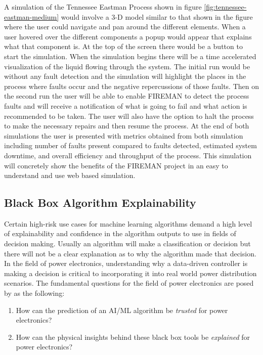 A simulation of the Tennessee Eastman Process shown in figure \ref{fig:tennessee-eastman-medium} would involve a 3-D model similar to that shown in the figure where the user could navigate and pan around the different elements. When a user hovered over the different components a popup would appear that explains what that component is. At the top of the screen there would be a button to start the simulation. When the simulation begins there will be a time accelerated visualization of the liquid flowing through the system. The initial run would be without any fault detection and the simulation will highlight the places in the process where faults occur and the negative repercussions of those faults. Then on the second run the user will be able to enable FIREMAN to detect the process faults and will receive a notification of what is going to fail and what action is recommended to be taken. The user will also have the option to halt the process to make the necessary repairs and then resume the process. At the end of both simulations the user is presented with metrics obtained from both simulation including number of faults present compared to faults detected, estimated system downtime, and overall efficiency and throughput of the process. This simulation will concretely show the benefits of the FIREMAN project in an easy to understand and use web based simulation.


\subsection{Black Box Algorithm Explainability}

Certain high-risk use cases for machine learning algorithms demand a high level of explainability and confidence in the algorithm outputs to use in fields of decision making. Usually an algorithm will make a classification or decision but there will not be a clear explanation as to why the algorithm made that decision. In the field of power electronics, understanding why a data-driven controller is making a decision is critical to incorporating it into real world power distribution scenarios. The fundamental questions for the field of power electronics are posed by \cite{black-box-explainability} as the following:
\begin{enumerate}
    \item How can the prediction of an AI/ML algorithm be \textit{trusted} for power electronics?
    \item How can the physical insights behind these black box tools be \textit{explained} for power electronics?
\end{enumerate}

